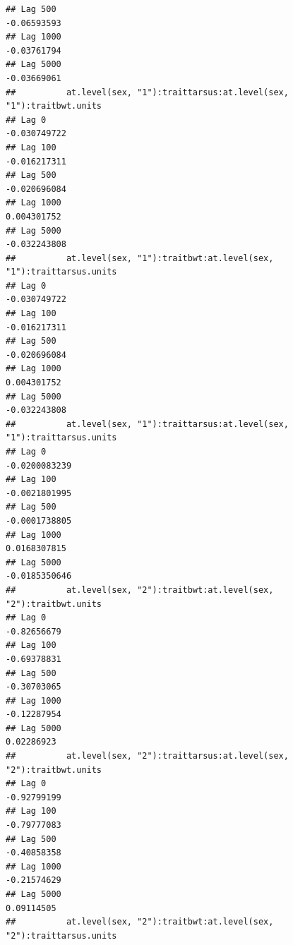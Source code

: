 \documentclass[
  12pt,
]{book}
\begin{document}
\begin{verbatim}
## Lag 500                                                    -0.06593593
## Lag 1000                                                   -0.03761794
## Lag 5000                                                   -0.03669061
##          at.level(sex, "1"):traittarsus:at.level(sex, "1"):traitbwt.units
## Lag 0                                                        -0.030749722
## Lag 100                                                      -0.016217311
## Lag 500                                                      -0.020696084
## Lag 1000                                                      0.004301752
## Lag 5000                                                     -0.032243808
##          at.level(sex, "1"):traitbwt:at.level(sex, "1"):traittarsus.units
## Lag 0                                                        -0.030749722
## Lag 100                                                      -0.016217311
## Lag 500                                                      -0.020696084
## Lag 1000                                                      0.004301752
## Lag 5000                                                     -0.032243808
##          at.level(sex, "1"):traittarsus:at.level(sex, "1"):traittarsus.units
## Lag 0                                                          -0.0200083239
## Lag 100                                                        -0.0021801995
## Lag 500                                                        -0.0001738805
## Lag 1000                                                        0.0168307815
## Lag 5000                                                       -0.0185350646
##          at.level(sex, "2"):traitbwt:at.level(sex, "2"):traitbwt.units
## Lag 0                                                      -0.82656679
## Lag 100                                                    -0.69378831
## Lag 500                                                    -0.30703065
## Lag 1000                                                   -0.12287954
## Lag 5000                                                    0.02286923
##          at.level(sex, "2"):traittarsus:at.level(sex, "2"):traitbwt.units
## Lag 0                                                         -0.92799199
## Lag 100                                                       -0.79777083
## Lag 500                                                       -0.40858358
## Lag 1000                                                      -0.21574629
## Lag 5000                                                       0.09114505
##          at.level(sex, "2"):traitbwt:at.level(sex, "2"):traittarsus.units

\end{verbatim}
\end{document}
